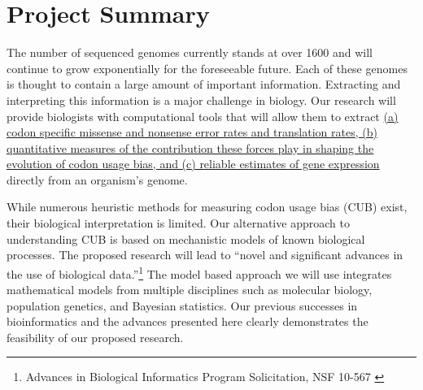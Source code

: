\documentclass[11pt,fleqn]{article}
\begin{document}
\section*{Project Summary}
The number of  sequenced genomes currently stands at over 1600 and will continue to grow exponentially for the foreseeable future.
Each of these genomes is thought to contain a large amount of important information.
Extracting and interpreting this information is a major challenge in biology.
Our research will provide biologists with computational tools that will allow them to extract \ul{(a) codon specific missense and nonsense error rates and translation rates, (b) quantitative measures of the contribution these forces play in shaping the evolution of codon usage bias, and (c) reliable estimates of gene expression} directly from an organism's genome. %

While numerous heuristic methods for measuring codon usage bias (CUB) exist, their biological interpretation is limited.
Our alternative approach to understanding CUB is based on mechanistic models of known biological processes. %
The proposed research will lead to ``novel and significant advances in the use of biological data.''\footnote{Advances in Biological Informatics Program Solicitation, NSF 10-567 \label{fn:abi}}
The model based approach we will use integrates mathematical models from multiple disciplines such as molecular biology, population genetics, and Bayesian statistics.
Our previous successes in bioinformatics and the advances presented here clearly demonstrates the feasibility of our proposed research.


\end{document}
